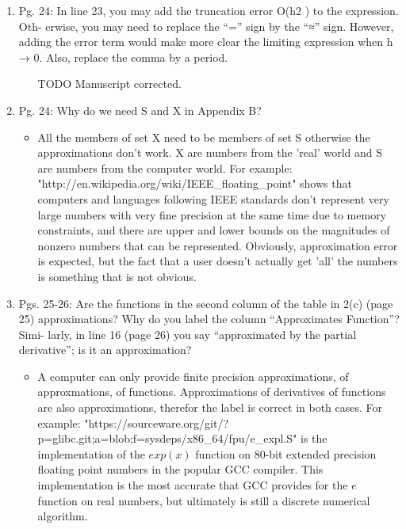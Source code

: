 \documentclass{article}
\begin{document}
\begin{enumerate}
 \item
    Pg. 24: In line 23, you may add the truncation error O(h2 ) to the expression. Oth-
    erwise, you may need to replace the “=” sign by the “≈” sign. However, adding
    the error term would make more clear the limiting expression when h → 0. Also,
    replace the comma by a period.

{\color{red}  
\begin{itemize}
     \item
         [TODO]
         Manuscript corrected.
  \end{itemize}}

\item    
Pg. 24: Why do we need S and X in Appendix B?

{\color{red}  
\begin{itemize}
     \item
     All the members of set X need to be members of set S otherwise the approximations don't work. X are numbers from the 'real' world and S are numbers from the computer world. For example: "http://en.wikipedia.org/wiki/IEEE_floating_point" shows that computers and languages following IEEE standards don't represent very large numbers with very fine precision at the same time due to memory constraints, and there are upper and lower bounds on the magnitudes of nonzero numbers that can be represented. Obviously, approximation error is expected, but the fact that a user doesn't actually get 'all' the numbers is something that is not obvious.
  \end{itemize}}


\item
    Pgs. 25-26: Are the functions in the second column of the table in 2(c) (page 25)
    approximations? Why do you label the column “Approximates Function”? Simi-
    larly, in line 16 (page 26) you say “approximated by the partial derivative”; is it an
    approximation?

{\color{red}  
\begin{itemize}
     \item
      A computer can only provide finite precision approximations, of approxmations, of functions. Approximations of derivatives of functions are also approximations, therefor the label is correct in both cases. For example: "https://sourceware.org/git/?p=glibc.git;a=blob;f=sysdeps/x86_64/fpu/e_expl.S" is the implementation of the $exp(x)$ function on 80-bit extended precision floating point numbers in the popular GCC compiler. This implementation is the most accurate that GCC provides for the $e$ function on real numbers, but ultimately is still a discrete numerical algorithm.
  \end{itemize}}


\end{enumerate}
\end{document}
